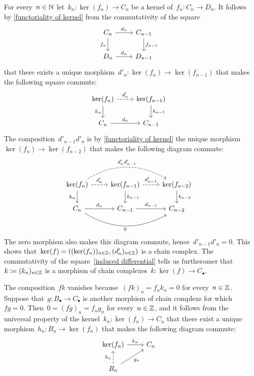 For every~$n \in \mathbb{N}$ let~$k_n \colon \ker(f_n) \to C_n$ be a kernel of~$f_n \colon C_n \to D_n$.
It follows by \cref{functoriality of kernel} from the commutativity of the square
\[
  \begin{tikzcd}
      C_n
      \arrow{r}[above]{d_n}
      \arrow{d}[left]{f_n}
    & C_{n-1}
      \arrow{d}[right]{f_{n-1}}
    \\
      D_n
      \arrow{r}[above]{d_n}
    & D_{n-1}
  \end{tikzcd}
\]
that there exists a unique morphism~$d'_n \colon \ker(f_n) \to \ker(f_{n-1})$ that makes the following square commute:
\begin{equation}
  \label{induced differential}
  \begin{tikzcd}
      \ker(f_n)
      \arrow[dashed]{r}[above]{d'_n}
      \arrow{d}[left]{k_n}
    & \ker(f_{n-1})
      \arrow{d}[right]{k_{n-1}}
    \\
      C_n
      \arrow{r}[above]{d_n}
    & C_{n-1}
  \end{tikzcd}
\end{equation}
The composition~$d'_{n-1} d'_n$ is by \cref{functoriality of kernel} the unique morphism~$\ker(f_n) \to \ker(f_{n-2})$ that makes the following diagram commute:
\[
  \begin{tikzcd}
      \ker(f_n)
      \arrow[dashed, bend left]{rr}[above]{d'_n d'_{n-1}}
      \arrow[dashed]{r}[above]{d'_n}
      \arrow{d}[left]{k_n}
    & \ker(f_{n-1})
      \arrow[dashed]{r}[above]{d'_{n-1}}
      \arrow{d}[right]{k_{n-1}}
    & \ker(f_{n-2})
      \arrow{d}[right]{k_{n-2}}
    \\
      C_n
      \arrow{r}[above]{d_n}
      \arrow[bend right]{rr}[below]{0}
    & C_{n-1}
      \arrow{r}[above]{d_{n-1}}
    & C_{n-2}
  \end{tikzcd}
\]
The zero morphism also makes this diagram commute, hence~$d'_{n-1} d'_n = 0$.
This shows that~$\ker(f) = ((\ker(f_n))_{n \in \mathbb{Z}}, (d'_n)_{n \in \mathbb{Z}})$ is a chain complex.
The commutativity of the square~\eqref{induced differential} tells us furtheromer that~$k \coloneqq (k_n)_{n \in \mathbb{Z}}$ is a morphism of chain complexes~$k \colon \ker(f) \to C_\bullet$.

The composition~$f k$ vanishes because~$(fk)_n = f_n k_n = 0$ for every~$n \in \mathbb{Z}$.
Suppose that~$g \colon B_\bullet \to C_\bullet$ is another morphism of chain complexs for which~$f g = 0$.
Then~$0 = (fg)_n = f_n g_n$ for every~$n \in \mathbb{Z}$, and it follows from the universal property of the kernel~$k_n \colon \ker(f_n) \to C_n$ that there exist a unique morphism~$h_n \colon B_n \to \ker(f_n)$ that makes the following diagram commute:
\begin{equation}
  \label{constructing triangle}
  \begin{tikzcd}
      \ker(f_n)
      \arrow{r}[above]{k_n}
    & C_n
    \\
      B_n
      \arrow[dashed]{u}[left]{h_n}
      \arrow{ur}[below right]{g_n}
    & {}
  \end{tikzcd}
\end{equation}


